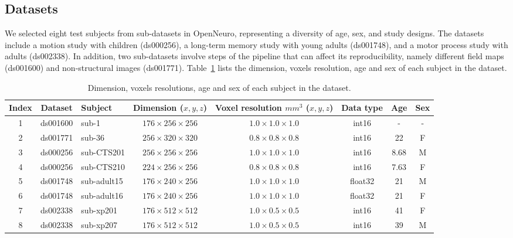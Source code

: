 \documentclass{article}
\begin{document}
\subsection{Datasets}

We selected eight test subjects from sub-datasets in OpenNeuro, representing a
diversity of age, sex, and study designs. The datasets include a motion study
with children (ds000256), a long-term memory study with young adults (ds001748),
and a motor process study with adults (ds002338). In addition, two sub-datasets
involve steps of the pipeline that can affect its reproducibility, namely
different field maps (ds001600) and non-structural images (ds001771).
Table~\ref{table:dataset_info} lists the dimension, voxels resolution, age and sex of each
subject in the dataset.

\begin{table}
    \begin{center}
        \begin{tabular}{c|c|l|c|c|c|c|c}
            Index & Dataset  & Subject     & Dimension ($x,y,z$)         & Voxel resolution $mm^3$ ($x,y,z$) & Data type & Age  & Sex \\
            \hline
            1     & ds001600 & sub-1       & $176 \times 256 \times 256$ & $1.0 \times 1.0 \times 1.0$       & int16     & -    & -   \\
            2     & ds001771 & sub-36      & $256 \times 320 \times 320$ & $0.8 \times 0.8 \times 0.8$       & int16     & 22   & F   \\
            3     & ds000256 & sub-CTS201  & $256 \times 256 \times 256$ & $1.0 \times 1.0 \times 1.0$       & int16     & 8.68 & M   \\
            4     & ds000256 & sub-CTS210  & $224 \times 256 \times 256$ & $0.8 \times 0.8 \times 0.8$       & int16     & 7.63 & F   \\
            5     & ds001748 & sub-adult15 & $176 \times 240 \times 256$ & $1.0 \times 1.0 \times 1.0$       & float32   & 21   & M   \\
            6     & ds001748 & sub-adult16 & $176 \times 240 \times 256$ & $1.0 \times 1.0 \times 1.0$       & float32   & 21   & F   \\
            7     & ds002338 & sub-xp201   & $176 \times 512 \times 512$ & $1.0 \times 0.5 \times 0.5$       & int16     & 41   & F   \\
            8     & ds002338 & sub-xp207   & $176 \times 512 \times 512$ & $1.0 \times 0.5 \times 0.5$       & int16     & 39   & M   \\
        \end{tabular}
    \end{center}
    \caption{Dimension, voxels resolutions, age and sex of each subject in the dataset.}
    \label{table:dataset_info}
\end{table}
\end{document}
